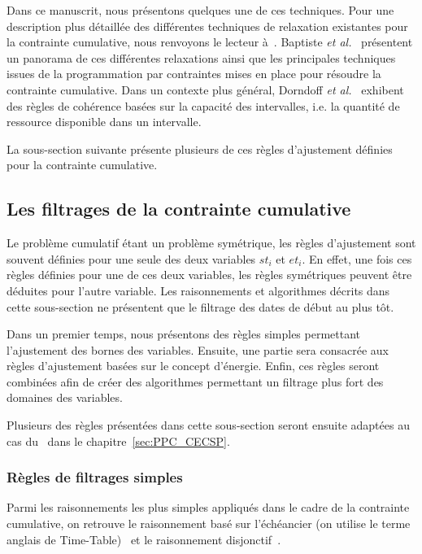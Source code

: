 Dans ce manuscrit, nous présentons quelques une de ces
techniques. Pour une description plus détaillée des différentes
techniques de relaxation existantes pour la contrainte cumulative,
nous renvoyons le lecteur à~\cite{BLPN,DHP}. 
Baptiste {\it et al.}~\cite{BLPN} présentent un panorama de ces
différentes relaxations ainsi que les principales techniques issues de
la programmation par contraintes mises en place pour résoudre la
contrainte cumulative. Dans un contexte plus général, Dorndoff {\it et
al.}~\cite{DHP} exhibent des règles de cohérence basées sur la
capacité des intervalles, i.e. la quantité de ressource disponible
dans un intervalle.

La sous-section suivante présente plusieurs de ces règles d'ajustement
définies pour la contrainte cumulative. 


\subsection{Les filtrages de la contrainte cumulative}
\label{sec:cumu_propag}

Le problème cumulatif étant un problème symétrique, les règles
d'ajustement sont souvent définies pour une seule des deux variables
$st_i$ et $et_i$. En effet, une fois ces règles définies pour une de
ces deux variables, les règles symétriques peuvent être déduites pour
l'autre variable. Les raisonnements et algorithmes décrits dans cette
sous-section ne présentent que le filtrage des dates de début au plus tôt.

Dans un premier temps, nous présentons des règles simples permettant
l'ajustement des bornes des variables. Ensuite, une partie sera
consacrée aux règles d'ajustement basées sur le concept
d'énergie. Enfin, ces règles seront combinées afin de créer
des algorithmes permettant un filtrage plus fort des domaines des
variables.

Plusieurs des règles présentées dans cette sous-section seront ensuite
adaptées au cas du \CECSP~dans le chapitre~\ref{sec:PPC_CECSP}.

\subsubsection{Règles de filtrages simples}

Parmi les raisonnements les plus simples appliqués dans le cadre de la
contrainte cumulative, on retrouve le raisonnement basé sur
l'échéancier (on utilise le terme anglais de Time-Table)~\cite{TTLah}
et le raisonnement disjonctif~\cite{BLPN}.

